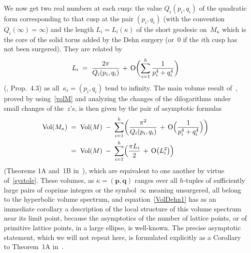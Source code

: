 \documentclass[12pt,reqno]{amsart}
\theoremstyle{definition}
\def\Vol{\mathrm{Vol}}
\def\k{\kappa}
\def\={\;=\;}
\def\+{\,+\,}
\def\be{\begin{equation}}
\def\ee{\end{equation}}
\newcommand{\mb}{\mathbf}
\def\O{\text O}
\def\bp{\mb p}  \def\bq{\mb q}  \def\bz{\mb z} \def\bw{\mb w}
\begin{document}
We now get two real numbers at each cusp: the value $Q_i(p_i,q_i)$ of the quadratic form
corresponding to that cusp at the pair $(p_i,q_i)$ (with the
convention~$Q_i(\infty)=\infty$) and the length
$L_i=L_i(\k)$ of the short geodesic on~$M_\k$ which is the core of the solid torus added
by the Dehn surgery
(or~0 if the $i$th cusp has not been surgered). They are related by
\be
\label{systole}
L_i \= \frac{2\pi}{Q_i(p_i,q_i)} \+ \O\biggl(\sum_{i=1}^h\frac1{p_i^4+q_i^4}\biggr)
\ee
(\cite{NZ}, Prop.~4.3) as all~$\k_i=(p_i,q_i)$ tend to infinity.  The main volume result
of~\cite{NZ}, proved by using~\eqref{volM} and analyzing the changes of the dilogarithms
under small changes of the~$z$'s, is then given by the pair of asymptotic formulas 
\begin{subequations}
  \label{XXX}
  \begin{align}\label{VolDehn1}
\Vol(M_\k) 
&\= \Vol(M) \;-\;\sum_{i=1}^h\biggl(\frac{\pi^2}{Q_i(p_i,q_i)}
\+ \O\Bigl(\frac1{p_i^4+q_i^4}\Bigr)\biggr) \\
\label{VolDehn2}  
&\= \Vol(M) \;-\;\sum_{i=1}^h\Bigl(\frac{\pi L_i}2 \+ \O\bigl(L_i^2\bigr)\Bigr)
\end{align} \end{subequations}
(Theorems 1A and~1B in~\cite{NZ}), which are equivalent to one another by virtue
of~\eqref{systole}. These volumes, as $\k=(\bp,\bq)$ ranges over all $h$-tuples of
sufficiently large pairs of coprime integers or the symbol~$\infty$ meaning unsurgered,
all belong to the hyperbolic volume spectrum, and equation~\eqref{VolDehn1} has as an
immediate corollary a description of the local structure of this volume spectrum near its
limit point, because the asymptotics of the number of lattice points, or of primitive
lattice points, in a large ellipse, is well-known.  The precise asymptotic statement, 
which we will not repeat here, is formulated explicitly as a Corollary to Theorem~1A
in~\cite{NZ}.
\end{document}
